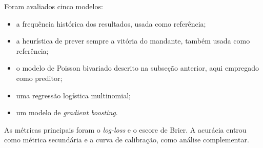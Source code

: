 Foram avaliados cinco modelos:

\begin{itemize}
  \item a frequência histórica dos resultados, usada como referência;
  \item a heurística de prever sempre a vitória do mandante, também usada como
    referência;
  \item o modelo de Poisson bivariado descrito na subseção anterior, aqui
    empregado como preditor;
  \item uma regressão logística multinomial;
  \item um modelo de \textit{gradient boosting}.
\end{itemize}

As métricas principais foram o \textit{log-loss} e o escore de Brier. A acurácia
entrou como métrica secundária e a curva de calibração, como análise
complementar.
